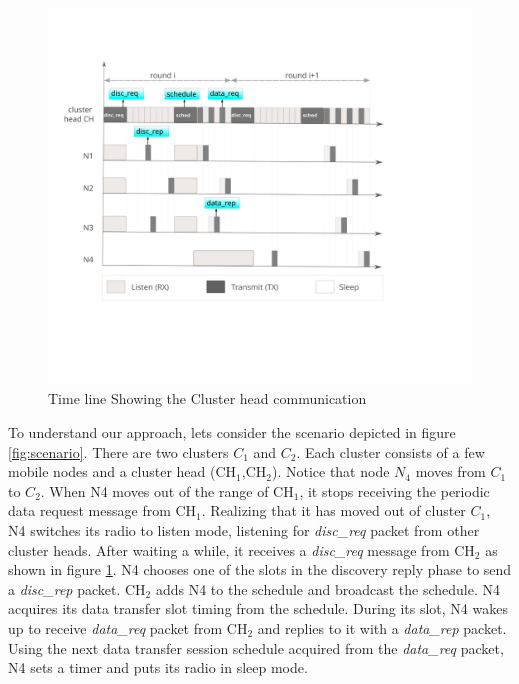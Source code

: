 \documentclass[a4paper, conference, 10pt]{IEEEtran}
\begin{document}
\begin{figure}[h]{} 
	\label{fig:timing}
  \begin{center}
    \includegraphics[scale=0.45, natwidth=0.38\textwidth]{timing-dia}
  \end{center}
  \caption{Time line Showing the Cluster head communication}
\end{figure}


To understand our approach, lets consider the scenario depicted in figure \ref{fig:scenario}. There are two clusters $C_1$ and $C_2$. Each cluster consists of a few mobile nodes and a cluster head (CH$_1$,CH$_2$). Notice that node \emph{$N_4$} moves from $C_1$ to $C_2$. When N4 moves out of the range of CH$_1$, it stops receiving the periodic data request message from CH$_1$. Realizing that it has moved out of cluster $C_1$, N4 switches its radio to listen mode, listening for \emph{disc\_req} packet from other cluster heads. After waiting a while, it receives a \emph{disc\_req} message from CH$_2$ as shown in figure \ref{fig:timing}. N4 chooses one of the slots in the discovery reply phase to send a \emph{disc\_rep} packet. CH$_2$ adds N4 to the schedule and broadcast the schedule. N4 acquires its data transfer slot timing from the schedule. During its slot, N4 wakes up to receive \emph{data\_req} packet from CH$_2$ and replies to it with a \emph{data\_rep} packet. Using the next data transfer session schedule acquired from the \emph{data\_req} packet, N4 sets a timer and puts its radio in sleep mode. 
\end{document}
